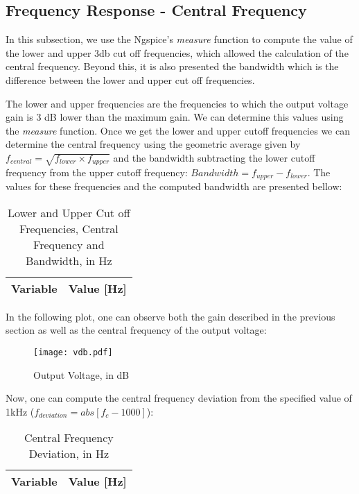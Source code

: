 \subsection{Frequency Response - Central Frequency}
\label{frequency_response}
\par In this subsection, we use the Ngspice's \textit{measure} function to compute the value of the lower and upper 3db cut off frequencies, which allowed the calculation of the central frequency. Beyond this, it is also presented the bandwidth which is the difference between the lower and upper cut off frequencies.
\par The lower and upper frequencies are the frequencies to which the output voltage gain is 3 dB lower than the maximum gain. We can determine this values using the \textit{measure} function. Once we get the lower and upper cutoff frequencies we can determine the central frequency using the geometric average given by $f_{central}=\sqrt{f_{lower}\times f_{upper}}$ and the bandwidth subtracting the lower cutoff frequency from the upper cutoff frequency: $Bandwidth = f_{upper}-f_{lower}$.
The values for these frequencies and the computed bandwidth are presented bellow:

\begin{table}[H]
  \centering
  \begin{tabular}{|l|r|}
    \hline    
    {\bf Variable} & {\bf Value [Hz]} \\ \hline
    
  \end{tabular}
  \caption{Lower and Upper Cut off Frequencies, Central Frequency and Bandwidth, in Hz}
  \label{tab:frequencies}
\end{table}

\par In the following plot, one can observe both the gain described in the previous section as well as the central frequency of the output voltage:
\begin{figure}[H] \centering
\texttt{[image: vdb.pdf]}
\caption{Output Voltage, in dB}
\label{fig:vdb}
\end{figure}

Now, one can compute the central frequency deviation from the specified value of 1kHz ($f_{deviation}=abs[f_c-1000]$):

\begin{table}[H]
  \centering
  \begin{tabular}{|l|r|}
    \hline    
    {\bf Variable} & {\bf Value [Hz]} \\ \hline
    
  \end{tabular}
  \caption{Central Frequency Deviation, in Hz}
  \label{tab:frequency_dev}
\end{table}



